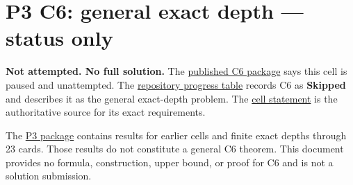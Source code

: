 \documentclass[11pt,a4paper]{article}
\begin{document}
\section{P3 C6: general exact depth --- status only}\label{p3-c6-general-exact-depth-status-only}

\textbf{Not attempted. No full solution.} The \href{https://github.com/mpelteshki/climbing-to-the-frontier/blob/212bba53b1818c08c40b8c4b48f636651eaf6410/cagent/p3/c6/README.md}{published C6 package} says this cell is paused and unattempted. The \href{https://github.com/mpelteshki/climbing-to-the-frontier/blob/212bba53b1818c08c40b8c4b48f636651eaf6410/README.md}{repository progress table} records C6 as \textbf{Skipped} and describes it as the general exact-depth problem. The \href{https://hackathon.bainsa.ai/p/p3/c6}{cell statement} is the authoritative source for its exact requirements.

The \href{https://github.com/mpelteshki/climbing-to-the-frontier/blob/212bba53b1818c08c40b8c4b48f636651eaf6410/cagent/p3/README.md}{P3 package} contains results for earlier cells and finite exact depths through 23 cards. Those results do not constitute a general C6 theorem. This document provides no formula, construction, upper bound, or proof for C6 and is not a solution submission.
\end{document}
